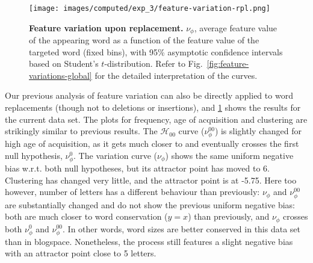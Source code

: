\documentclass[a4paper,fleqn]{cas-dc}
\begin{document}
\begin{figure}
  \centering
  \texttt{[image: images/computed/exp\_3/feature-variation-rpl.png]}
  \caption[Feature variation upon replacement]{
  \textbf{Feature variation upon replacement.}
  $\nu_{\phi}$, average feature value of the appearing word as a function of the feature value of the targeted word (fixed bins), with 95\% asymptotic confidence intervals based on Student's $t$-distribution.
  Refer to Fig.~\ref{fig:feature-variations-global} for the detailed interpretation of the curves.
  }
  \label{fig:gistr-variation-rpl}
\end{figure}

Our previous analysis of feature variation can also be directly applied
to word replacements (though not to deletions or insertions), and
\cref{fig:gistr-variation-rpl} shows the results for the current data
set. The plots for frequency, age of acquisition and clustering are
strikingly similar to previous results. The \(\mathcal{H}_{00}\) curve
(\(\nu_{\phi}^{00}\)) is slightly changed for high age of acquisition,
as it gets much closer to and eventually crosses the first null
hypothesis, \(\nu_{\phi}^0\). The variation curve (\(\nu_{\phi}\)) shows
the same uniform negative bias w.r.t. both null hypotheses, but its
attractor point has moved to 6. Clustering has changed very little, and
the attractor point is at -5.75. Here too however, number of letters has
a different behaviour than previously: \(\nu_{\phi}\) and
\(\nu_{\phi}^{00}\) are substantially changed and do not show the
previous uniform negative bias: both are much closer to word
conservation (\(y = x\)) than previously, and \(\nu_{\phi}\) crosses
both \(\nu_{\phi}^0\) and \(\nu_{\phi}^{00}\). In other words, word
sizes are better conserved in this data set than in blogspace.
Nonetheless, the process still features a slight negative bias with an
attractor point close to 5 letters.
\end{document}
